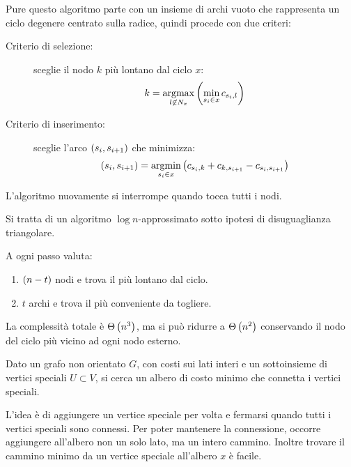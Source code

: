 \documentclass[\main/main.tex]{subfiles}
\begin{document}
\begin{multicols}{2}
\begin{definition}
    Pure questo algoritmo parte con un insieme di archi vuoto che rappresenta un ciclo degenere centrato sulla radice, quindi procede con due criteri:
    \begin{description}
        \item[Criterio di selezione:] sceglie il nodo \(k\) più lontano dal ciclo \(x\):
        \[
            k = \operatorname*{argmax}_{l \not\in N_x}\left(\min_{s_i \in x} c_{s_i, l}\right)
        \]
        \item[Criterio di inserimento:] sceglie l'arco \(\left(s_i, s_{i+1}\right)\) che minimizza:
        \[
            \left(s_i, s_{i+1}\right) = \operatorname*{argmin}_{s_i \in x} \left(c_{s_i, k} + c_{k, s_{i+1}} - c_{s_i, s_{i+1}}\right)
        \]
    \end{description}
\end{definition}
\begin{observation}
    L'algoritmo nuovamente si interrompe quando tocca tutti i nodi.
\end{observation}
\begin{observation}
    Si tratta di un algoritmo \(\log n\)-approssimato sotto ipotesi di disuguaglianza triangolare.
\end{observation}
\begin{complexity}
    A ogni passo valuta:
    \begin{enumerate}
        \item \(\left(n-t\right)\) nodi e trova il più lontano dal ciclo.
        \item \(t\) archi e trova il più conveniente da togliere.
    \end{enumerate}
    
    La complessità totale è \(\Theta\left(n^3\right)\), ma si può ridurre a \(\Theta\left(n^2\right)\) conservando il nodo del ciclo più vicino ad ogni nodo esterno.
\end{complexity}

\begin{definition}
    Dato un grafo non orientato \(G\), con costi sui lati interi e un sottoinsieme di vertici speciali \(U \subset V\), si cerca un albero di costo minimo che connetta i vertici speciali. 

    L'idea è di aggiungere un vertice speciale per volta e fermarsi quando tutti i vertici speciali sono connessi. Per poter mantenere la connessione, occorre aggiungere all'albero non un solo lato, ma un intero cammino. Inoltre trovare il cammino minimo da un vertice speciale all'albero \(x\) è facile.
    

\end{definition}
\end{multicols}
\end{document}
